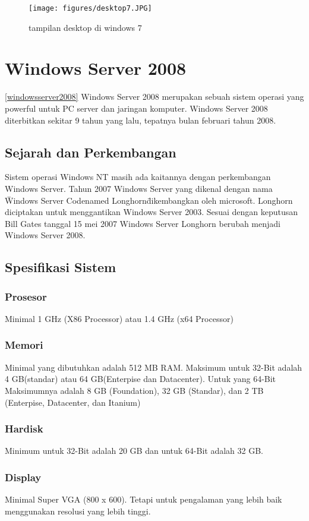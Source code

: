 \begin{enumerate}
\cite{zhang2010exploratory} 

\begin{figure}[ht]
\centerline{\texttt{[image: figures/desktop7.JPG]}}
\caption{tampilan desktop di windows 7}
\label{desktop7}
\end{figure}

	\section{Windows Server 2008}
\ref{windowsserver2008}
	Windows Server 2008 merupakan sebuah sistem operasi yang powerful untuk PC server dan jaringan komputer. Windows Server 2008 diterbitkan sekitar 9 tahun yang lalu, tepatnya bulan februari tahun 2008.\cite{wahyono2009practice}
	\subsection{Sejarah dan Perkembangan}
		Sistem operasi Windows NT masih ada kaitannya dengan perkembangan Windows Server. Tahun 2007 Windows Server yang dikenal dengan nama \" Windows Server Codenamed Longhorn\" dikembangkan oleh microsoft. Longhorn diciptakan untuk menggantikan Windows Server 2003. Sesuai dengan keputusan Bill Gates tanggal 15 mei 2007 Windows Server Longhorn berubah menjadi Windows Server 2008.
	\subsection{Spesifikasi Sistem}
		\subsubsection{Prosesor}
		Minimal 1 GHz (X86 Processor) atau 1.4 GHz (x64 Processor)
		\subsubsection{Memori}
		Minimal yang dibutuhkan adalah 512 MB RAM. Maksimum untuk 32-Bit adalah 4 GB(standar) atau 64 GB(Enterpise dan Datacenter). Untuk yang 64-Bit Maksimumnya adalah 8 GB (Foundation), 32 GB (Standar), dan 2 TB (Enterpise, Datacenter, dan Itanium)
		\subsubsection{Hardisk}
		Minimum untuk 32-Bit adalah 20 GB dan untuk 64-Bit adalah 32 GB.
		\subsubsection{Display}
		Minimal Super VGA (800 x 600). Tetapi untuk pengalaman yang lebih baik menggunakan resolusi yang lebih tinggi.

\end{enumerate}
